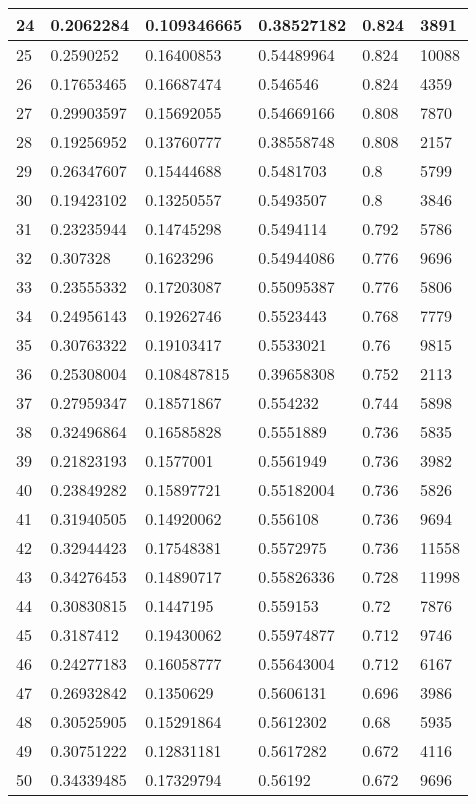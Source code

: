 \begin{longtable}{|l|l|l|l|l|l|}
24 & 0.2062284 & 0.109346665 & 0.38527182 & 0.824 & 3891 \\ \hline 
25 & 0.2590252 & 0.16400853 & 0.54489964 & 0.824 & 10088 \\ \hline 
26 & 0.17653465 & 0.16687474 & 0.546546 & 0.824 & 4359 \\ \hline 
27 & 0.29903597 & 0.15692055 & 0.54669166 & 0.808 & 7870 \\ \hline 
28 & 0.19256952 & 0.13760777 & 0.38558748 & 0.808 & 2157 \\ \hline 
29 & 0.26347607 & 0.15444688 & 0.5481703 & 0.8 & 5799 \\ \hline 
30 & 0.19423102 & 0.13250557 & 0.5493507 & 0.8 & 3846 \\ \hline 
31 & 0.23235944 & 0.14745298 & 0.5494114 & 0.792 & 5786 \\ \hline 
32 & 0.307328 & 0.1623296 & 0.54944086 & 0.776 & 9696 \\ \hline 
33 & 0.23555332 & 0.17203087 & 0.55095387 & 0.776 & 5806 \\ \hline 
34 & 0.24956143 & 0.19262746 & 0.5523443 & 0.768 & 7779 \\ \hline 
35 & 0.30763322 & 0.19103417 & 0.5533021 & 0.76 & 9815 \\ \hline 
36 & 0.25308004 & 0.108487815 & 0.39658308 & 0.752 & 2113 \\ \hline 
37 & 0.27959347 & 0.18571867 & 0.554232 & 0.744 & 5898 \\ \hline 
38 & 0.32496864 & 0.16585828 & 0.5551889 & 0.736 & 5835 \\ \hline 
39 & 0.21823193 & 0.1577001 & 0.5561949 & 0.736 & 3982 \\ \hline 
40 & 0.23849282 & 0.15897721 & 0.55182004 & 0.736 & 5826 \\ \hline 
41 & 0.31940505 & 0.14920062 & 0.556108 & 0.736 & 9694 \\ \hline 
42 & 0.32944423 & 0.17548381 & 0.5572975 & 0.736 & 11558 \\ \hline 
43 & 0.34276453 & 0.14890717 & 0.55826336 & 0.728 & 11998 \\ \hline 
44 & 0.30830815 & 0.1447195 & 0.559153 & 0.72 & 7876 \\ \hline 
45 & 0.3187412 & 0.19430062 & 0.55974877 & 0.712 & 9746 \\ \hline 
46 & 0.24277183 & 0.16058777 & 0.55643004 & 0.712 & 6167 \\ \hline 
47 & 0.26932842 & 0.1350629 & 0.5606131 & 0.696 & 3986 \\ \hline 
48 & 0.30525905 & 0.15291864 & 0.5612302 & 0.68 & 5935 \\ \hline 
49 & 0.30751222 & 0.12831181 & 0.5617282 & 0.672 & 4116 \\ \hline 
50 & 0.34339485 & 0.17329794 & 0.56192 & 0.672 & 9696 \\ \hline 
\end{longtable}